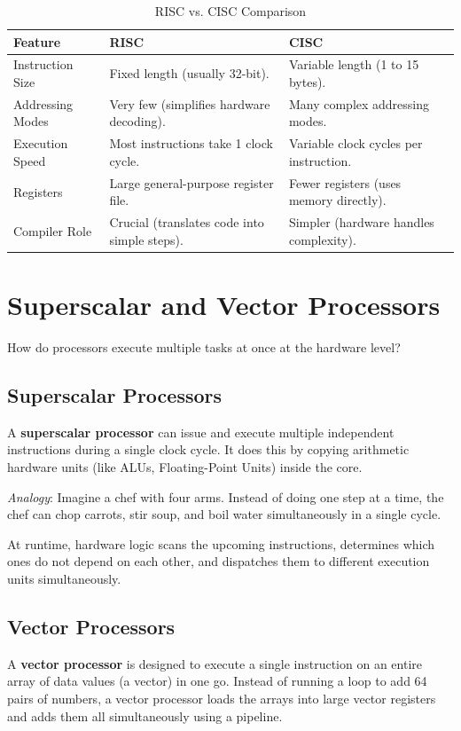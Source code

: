 \documentclass[11pt,a4paper]{article}
\begin{document}
\begin{table}[h]
\centering
\caption{RISC vs. CISC Comparison}
\begin{tabularx}{\textwidth}{@{}lXX@{}}
\toprule
\textbf{Feature} & \textbf{RISC} & \textbf{CISC} \\ \midrule
Instruction Size & Fixed length (usually 32-bit). & Variable length (1 to 15 bytes). \\
Addressing Modes & Very few (simplifies hardware decoding). & Many complex addressing modes. \\
Execution Speed & Most instructions take 1 clock cycle. & Variable clock cycles per instruction. \\
Registers & Large general-purpose register file. & Fewer registers (uses memory directly). \\
Compiler Role & Crucial (translates code into simple steps). & Simpler (hardware handles complexity). \\ \bottomrule
\end{tabularx}
\end{table}

\section{Superscalar and Vector Processors}

How do processors execute multiple tasks at once at the hardware level?

\subsection{Superscalar Processors}
A \textbf{superscalar processor} can issue and execute multiple independent instructions during a single clock cycle. It does this by copying arithmetic hardware units (like ALUs, Floating-Point Units) inside the core.

\textit{Analogy}: Imagine a chef with four arms. Instead of doing one step at a time, the chef can chop carrots, stir soup, and boil water simultaneously in a single cycle.

At runtime, hardware logic scans the upcoming instructions, determines which ones do not depend on each other, and dispatches them to different execution units simultaneously.

\subsection{Vector Processors}
A \textbf{vector processor} is designed to execute a single instruction on an entire array of data values (a vector) in one go. Instead of running a loop to add 64 pairs of numbers, a vector processor loads the arrays into large vector registers and adds them all simultaneously using a pipeline.
\end{document}
